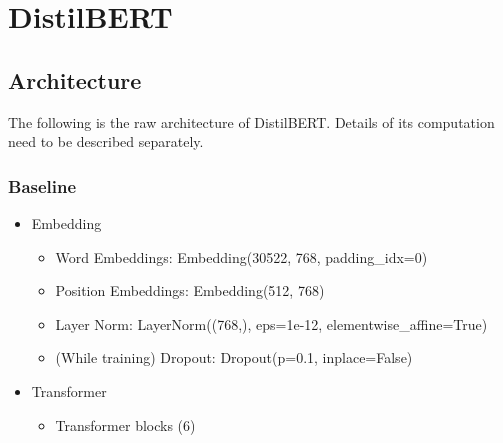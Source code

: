 \documentclass{article}
\begin{document}
\section{DistilBERT}

\subsection{Architecture}

The following is the raw architecture of DistilBERT.  Details of its computation need to be described separately.

\subsubsection{Baseline}

\begin{itemize}
\item Embedding

\begin{itemize}
\item Word Embeddings: Embedding(30522, 768, padding\_idx=0)
\item Position Embeddings: Embedding(512, 768)
\item Layer Norm: LayerNorm((768,), eps=1e-12, elementwise\_affine=True)
\item (While training) Dropout: Dropout(p=0.1, inplace=False)
\end{itemize}

\item Transformer
\begin{itemize}

\item Transformer blocks (6)
\begin{itemize}


\end{itemize}
\end{itemize}
\end{itemize}
\end{document}
